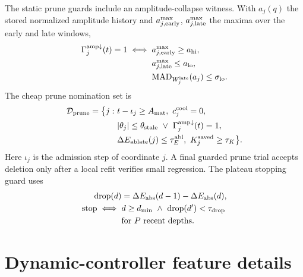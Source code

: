 \documentclass[
  reprint,
  amsmath,
  amssymb,
  aps,
  pra,
  nofootinbib,
  superscriptaddress,
  floatfix
]{revtex4-2}
\newcommand{\Dcal}{\mathcal{D}}
\begin{document}
The static prune guards include an amplitude-collapse witness. With $a_j(q)$ the stored normalized amplitude history and $a_{j,\rm early}^{\max}$, $a_{j,\rm late}^{\max}$ the maxima over the early and late windows,
\begin{equation}
\begin{aligned}
\Gamma_j^{\rm amp\downarrow}(t)=1
\iff{}&
a_{j,\rm early}^{\max}\ge a_{\rm hi},\\
&a_{j,\rm late}^{\max}\le a_{\rm lo},\\
&{\rm MAD}_{W_j^{\rm late}}(a_j)\le \sigma_{\rm lo}.
\end{aligned}
\label{eq:amp_collapse_witness}
\end{equation}
The cheap prune nomination set is
\begin{equation}
\begin{aligned}
\Dcal_{\rm prune}=\bigl\{j:\ &t-\iota_j\ge A_{\rm mat},\ c_j^{\rm cool}=0,\\
&|\theta_j|\le \theta_{\rm stale}\ \vee\ \Gamma_j^{\rm amp\downarrow}(t)=1,\\
&\Delta E_{\rm ablate}(j)\le \tau_E^{\rm abl},\ K_j^{\rm saved}\ge \tau_K\bigr\}.
\end{aligned}
\label{eq:static_prune_candidates}
\end{equation}
Here $\iota_j$ is the admission step of coordinate $j$. A final guarded prune trial accepts deletion only after a local refit verifies small regression. The plateau stopping guard uses
\begin{equation}
\begin{aligned}
{\rm drop}(d)&=\Delta E_{\rm abs}(d-1)-\Delta E_{\rm abs}(d),\\
{\rm stop}\iff{}&d\ge d_{\min}\ \wedge\ {\rm drop}(d')<\tau_{\rm drop}\\
&\text{for } P\ \text{recent depths}.
\end{aligned}
\label{eq:plateau_stop}
\end{equation}

\section{Dynamic-controller feature details}
\label{app:dynamic_controller_details}
\end{document}
